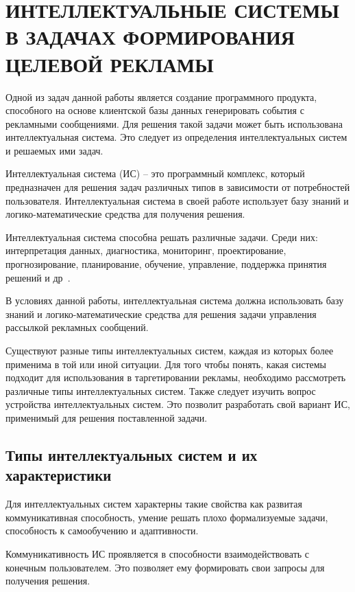 \chapter{ИНТЕЛЛЕКТУАЛЬНЫЕ СИСТЕМЫ В ЗАДАЧАХ ФОРМИРОВАНИЯ ЦЕЛЕВОЙ РЕКЛАМЫ}

Одной из задач данной работы является создание программного продукта, способного на основе клиентской базы данных генерировать события с рекламными сообщениями. Для решения такой задачи может быть использована  интеллектуальная система. Это следует из определения интеллектуальных систем и решаемых ими задач.

Интеллектуальная система (ИС) – это программный комплекс, который предназначен для решения задач различных типов в зависимости от потребностей пользователя. Интеллектуальная система в своей работе использует базу знаний и логико-математические средства для получения решения.

Интеллектуальная система способна решать различные задачи. Среди них: интерпретация данных, диагностика, мониторинг, проектирование, прогнозирование, планирование, обучение, управление, поддержка принятия решений и др~\cite{is1}.

В условиях данной работы, интеллектуальная система должна использовать базу знаний и логико-математические средства для решения задачи управления рассылкой рекламных сообщений.

Существуют разные типы интеллектуальных систем, каждая из которых более применима в той или иной ситуации. Для того чтобы понять, какая системы подходит для использования в таргетировании рекламы, необходимо рассмотреть различные типы интеллектуальных систем. Также следует изучить вопрос устройства интеллектуальных систем. Это позволит разработать свой вариант ИС, применимый для решения поставленной задачи.

\section{Типы интеллектуальных систем и их характеристики}

Для интеллектуальных систем характерны такие свойства как развитая коммуникативная способность, умение решать плохо формализуемые задачи, способность к самообучению и адаптивности.

Коммуникативность ИС проявляется в способности взаимодействовать с конечным пользователем. Это позволяет ему формировать свои запросы для получения решения.

